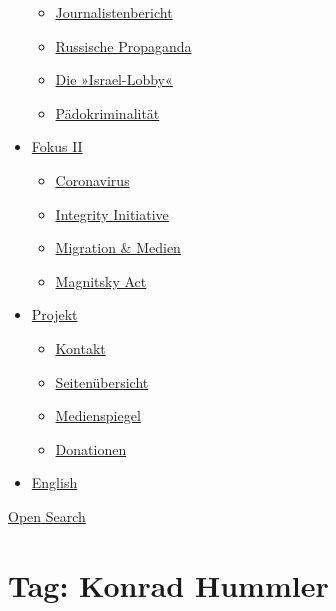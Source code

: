 \begin{itemize}
  \begin{itemize}
  \tightlist
  \item
    \href{https://swprs.org/bericht-eines-journalisten/}{Journalistenbericht}
  \item
    \href{https://swprs.org/russische-propaganda/}{Russische Propaganda}
  \item
    \href{https://swprs.org/die-israel-lobby-fakten-und-mythen/}{Die
    »Israel-Lobby«}
  \item
    \href{https://swprs.org/geopolitik-und-paedokriminalitaet/}{Pädokriminalität}
  \end{itemize}
\item
  \href{https://swprs.org/migration-und-medien/}{Fokus II}

  \begin{itemize}
  \tightlist
  \item
    \href{https://swprs.org/covid-19-hinweis-ii/}{Coronavirus}
  \item
    \href{https://swprs.org/die-integrity-initiative/}{Integrity
    Initiative}
  \item
    \href{https://swprs.org/migration-und-medien/}{Migration \& Medien}
  \item
    \href{https://swprs.org/der-fall-magnitsky/}{Magnitsky Act}
  \end{itemize}
\item
  \href{https://swprs.org/kontakt/}{Projekt}

  \begin{itemize}
  \tightlist
  \item
    \href{https://swprs.org/kontakt/}{Kontakt}
  \item
    \href{https://swprs.org/uebersicht/}{Seitenübersicht}
  \item
    \href{https://swprs.org/medienspiegel/}{Medienspiegel}
  \item
    \href{https://swprs.org/donationen/}{Donationen}
  \end{itemize}
\item
  \href{https://swprs.org/contact/}{English}
\end{itemize}

\protect\hyperlink{}{Open Search}

\hypertarget{tag-konrad-hummler}{%
\section{Tag: Konrad Hummler}\label{tag-konrad-hummler}}

